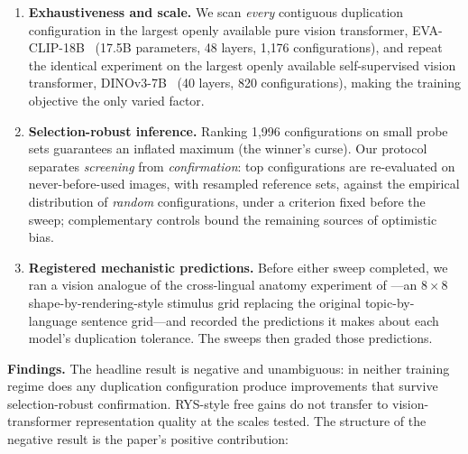 \documentclass{article}
\newcommand{\eva}{EVA-CLIP-18B}
\newcommand{\dino}{DINOv3-7B}
\begin{document}
\begin{enumerate}
\item \textbf{Exhaustiveness and scale.} We scan \emph{every} contiguous
duplication configuration in the largest openly available pure vision
transformer, \eva{}~\citep{sun2024evaclip} (17.5B parameters, 48 layers,
1{,}176 configurations), and repeat the identical experiment on the
largest openly available self-supervised vision transformer,
\dino{}~\citep{simeoni2025dinov3} (40 layers, 820 configurations),
making the training objective the only varied factor.
\item \textbf{Selection-robust inference.} Ranking 1{,}996 configurations
on small probe sets guarantees an inflated maximum (the winner's curse).
Our protocol separates \emph{screening} from \emph{confirmation}: top
configurations are re-evaluated on never-before-used images, with
resampled reference sets, against the empirical distribution of
\emph{random} configurations, under a criterion fixed before the sweep;
complementary controls bound the remaining sources of optimistic bias.
\item \textbf{Registered mechanistic predictions.} Before either sweep
completed, we ran a vision analogue of the cross-lingual anatomy
experiment of \citet{hankins2025sapirwhorf}---an $8{\times}8$
shape-by-rendering-style stimulus grid replacing the original
topic-by-language sentence grid---and recorded the predictions it makes
about each model's duplication tolerance. The sweeps then graded those
predictions.
\end{enumerate}

\textbf{Findings.} The headline result is negative and unambiguous: in
neither training regime does any duplication configuration produce
improvements that survive selection-robust confirmation. RYS-style free
gains do not transfer to vision-transformer representation quality at the
scales tested. The structure of the negative result is the paper's
positive contribution:
\end{document}
